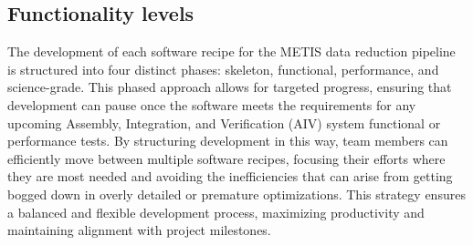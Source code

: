 \documentclass[a4paper]{spie}  %
\begin{document}
\subsection{Functionality levels}

The development of each software recipe for the METIS data reduction pipeline is structured into four distinct phases: skeleton, functional, performance, and science-grade. This phased approach allows for targeted progress, ensuring that development can pause once the software meets the requirements for any upcoming Assembly, Integration, and Verification (AIV) system functional or performance tests. By structuring development in this way, team members can efficiently move between multiple software recipes, focusing their efforts where they are most needed and avoiding the inefficiencies that can arise from getting bogged down in overly detailed or premature optimizations. This strategy ensures a balanced and flexible development process, maximizing productivity and maintaining alignment with project milestones. 
  
\end{document}
